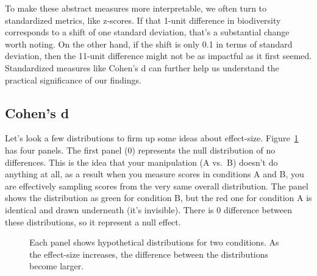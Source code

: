 \documentclass[
  letterpaper,
  DIV=11,
  numbers=noendperiod]{scrreprt}
\begin{document}
To make these abstract measures more interpretable, we often turn to
standardized metrics, like z-scores. If that 1-unit difference in
biodiversity corresponds to a shift of one standard deviation, that's a
substantial change worth noting. On the other hand, if the shift is only
0.1 in terms of standard deviation, then the 11-unit difference might
not be as impactful as it first seemed. Standardized measures like
Cohen's d can further help us understand the practical significance of
our findings.

\subsection{Cohen's d}\label{cohens-d}

Let's look a few distributions to firm up some ideas about effect-size.
Figure~\ref{fig-5.5effectdists} has four panels. The first panel (0)
represents the null distribution of no differences. This is the idea
that your manipulation (A vs.~B) doesn't do anything at all, as a result
when you measure scores in conditions A and B, you are effectively
sampling scores from the very same overall distribution. The panel shows
the distribution as green for condition B, but the red one for condition
A is identical and drawn underneath (it's invisible). There is 0
difference between these distributions, so it represent a null effect.

\begin{figure}


\caption{\label{fig-5.5effectdists}Each panel shows hypothetical
distributions for two conditions. As the effect-size increases, the
difference between the distributions become larger.}

\end{figure}%
\end{document}
